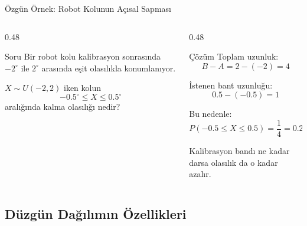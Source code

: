 \documentclass[light]{lutbeamer}
\begin{document}
\begin{frame}{Özgün Örnek: Robot Kolunun Açısal Sapması}
\small
\begin{columns}[T,onlytextwidth]
    \begin{column}{0.48\textwidth}
        \begin{block}{Soru}
            Bir robot kolu kalibrasyon sonrasında $-2^\circ$ ile $2^\circ$ arasında eşit olasılıkla konumlanıyor.

            \vspace{0.15cm}
            $X \sim U(-2,2)$ iken kolun
            \[
            -0.5^\circ \le X \le 0.5^\circ
            \]
            aralığında kalma olasılığı nedir?
        \end{block}
    \end{column}
    \begin{column}{0.48\textwidth}
        \begin{exampleblock}{Çözüm}
            Toplam uzunluk:
            \[
            B-A = 2-(-2)=4
            \]

            İstenen bant uzunluğu:
            \[
            0.5-(-0.5)=1
            \]

            Bu nedenle:
            \[
            P(-0.5 \le X \le 0.5)=\frac{1}{4}=0.25
            \]

            Kalibrasyon bandı ne kadar darsa olasılık da o kadar azalır.
        \end{exampleblock}
    \end{column}
\end{columns}
\end{frame}

\subsection{Düzgün Dağılımın Özellikleri}
\end{document}
